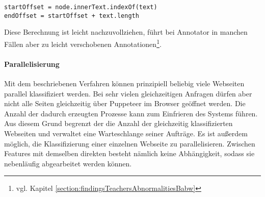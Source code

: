     \begin{lstlisting}
startOffset = node.innerText.indexOf(text)
endOffset = startOffset + text.length
    \end{lstlisting}
    
    Diese Berechnung ist leicht nachzuvollziehen,
    führt bei Annotator in manchen Fällen aber zu leicht verschobenen
    Annotationen\footnote{vgl. Kapitel \ref{section:findingsTeachersAbnormalitiesBabw}}.

    \paragraph{Parallelisierung}
    Mit dem beschriebenen Verfahren können prinzipiell beliebig viele Webseiten parallel klassifiziert werden.
    Bei sehr vielen gleichzeitigen Anfragen dürfen aber nicht alle Seiten
    gleichzeitig über Puppeteer im Browser geöffnet werden.
    Die Anzahl der dadurch erzeugten Prozesse kann zum Einfrieren des Systems führen.
    Aus diesem Grund begrenzt der {\classificationService} die Anzahl der gleichzeitig klassifizierten Webseiten
    und verwaltet eine Warteschlange seiner Aufträge.
    Es ist außerdem möglich, die Klassifizierung einer einzelnen Webseite zu parallelisieren.
    Zwischen Features mit demselben direkten {\parentFeature} besteht nämlich keine Abhängigkeit,
    sodass sie nebenläufig abgearbeitet werden können.
